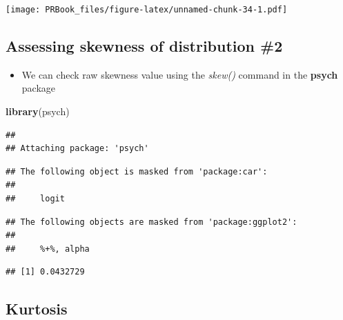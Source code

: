 \documentclass[
]{book}
\newenvironment{Shaded}{\begin{snugshade}}{\end{snugshade}}
\newcommand{\KeywordTok}[1]{\textcolor[rgb]{0.13,0.29,0.53}{\textbf{#1}}}
\newcommand{\NormalTok}[1]{#1}
\newcommand{\OperatorTok}[1]{\textcolor[rgb]{0.81,0.36,0.00}{\textbf{#1}}}
\providecommand{\tightlist}{%
  \setlength{\itemsep}{0pt}\setlength{\parskip}{0pt}}
\begin{document}
\begin{Shaded}
\end{Shaded}

\texttt{[image: PRBook\_files/figure-latex/unnamed-chunk-34-1.pdf]}

\hypertarget{assessing-skewness-of-distribution-2}{%
\subsection{Assessing skewness of distribution \#2}\label{assessing-skewness-of-distribution-2}}

\begin{itemize}
\tightlist
\item
  We can check raw skewness value using the \emph{skew()} command in the \textbf{psych} package
\end{itemize}

\begin{Shaded}
\begin{Highlighting}[]
\KeywordTok{library}\NormalTok{(psych)}
\end{Highlighting}
\end{Shaded}

\begin{verbatim}
## 
## Attaching package: 'psych'
\end{verbatim}

\begin{verbatim}
## The following object is masked from 'package:car':
## 
##     logit
\end{verbatim}

\begin{verbatim}
## The following objects are masked from 'package:ggplot2':
## 
##     %+%, alpha
\end{verbatim}

\begin{Shaded}
\end{Shaded}

\begin{verbatim}
## [1] 0.0432729
\end{verbatim}

\hypertarget{kurtosis}{%
\subsection{Kurtosis}\label{kurtosis}}
\end{document}
